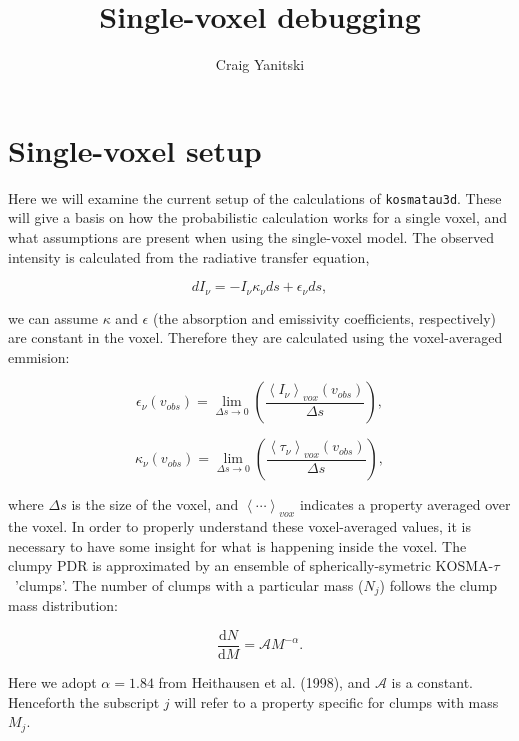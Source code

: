 \documentclass[a4paper]{article}
\newcommand{\kosmatau}{KOSMA-\(\tau\)}
\begin{document}
    \title{Single-voxel debugging}
    \author{Craig Yanitski}
    \maketitle

    \section{Single-voxel setup}
    \label{setup}

    Here we will examine the current setup of the calculations of \texttt{kosmatau3d}.
    These will give a basis on how the probabilistic calculation works for a single voxel, and what assumptions are present when using the single-voxel model.
    The observed intensity is calculated from the radiative transfer equation,

    \[
    dI_\nu = - I_\nu \kappa_\nu ds + \epsilon_\nu ds,
    \]

    we can assume \(\kappa\) and \(\epsilon\) (the absorption and emissivity coefficients, respectively) are constant in the voxel.
    Therefore they are calculated using the voxel-averaged emmision:

    \[
    \epsilon_\nu (v_{obs}) = \lim_{\Delta s \to 0} \left( \frac{\left<I_\nu\right>_{vox} (v_{obs})}{\Delta s} \right),
    \]

    \[
    \kappa_\nu (v_{obs}) = \lim_{\Delta s \to 0} \left( \frac{\left<\tau_\nu\right>_{vox} (v_{obs})}{\Delta s} \right),
    \]

    where \(\Delta s\) is the size of the voxel, and \(\left< \cdots \right>_{vox}\) indicates a property averaged over the voxel.
    In order to properly understand these voxel-averaged values, it is necessary to have some insight for what is happening inside the voxel.
    The clumpy PDR is approximated by an ensemble of spherically-symetric \kosmatau \ 'clumps'.
    The number of clumps with a particular mass (\(N_j\)) follows the clump mass distribution:

    \[
    \frac{\mathrm{d}N}{\mathrm{d}M} = \mathcal{A} M^{-\alpha}.
    \]

    Here we adopt \(\alpha=1.84\) from Heithausen et al. (1998), and \(\mathcal{A}\) is a constant.
    Henceforth the subscript \(j\) will refer to a property specific for clumps with mass \(M_j\).
\end{document}
